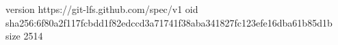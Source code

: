 version https://git-lfs.github.com/spec/v1
oid sha256:6f80a2f117fcbdd1f82edccd3a71741f38aba341827fc123efe16dba61b85d1b
size 2514
